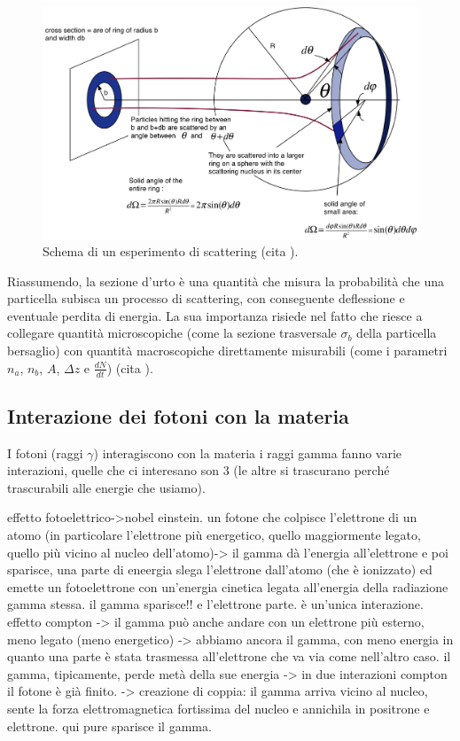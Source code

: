 \documentclass[12pt,a4paper,twoside]{report}
\begin{document}
	\begin{figure}[H]
		\centering
		\includegraphics[width=0.9\linewidth]{images/solid_angle.png}
		\caption{Schema di un esperimento di scattering (cita
			).}
		\label{fig:solid_angle}
	\end{figure}
	
	Riassumendo, la sezione d'urto è una quantità che misura la probabilità che una particella subisca un processo di scattering, con conseguente deflessione e eventuale perdita di energia. La sua importanza risiede nel fatto che riesce a collegare quantità microscopiche (come la sezione trasversale $\sigma_b$ della particella bersaglio) con quantità macroscopiche direttamente misurabili (come i parametri $n_a$, $n_b$, $A$, $\Delta z$ e $\frac{dN}{dt}$) (cita
	).
	
	\subsection{Interazione dei fotoni con la materia}	
	I fotoni (raggi $\gamma$) interagiscono con la materia i raggi gamma fanno varie interazioni, quelle che ci interesano son 3 (le altre si trascurano perché trascurabili alle energie che usiamo).
	
	effetto fotoelettrico->nobel einstein. un fotone che colpisce l'elettrone di un atomo (in particolare l'elettrone più energetico, quello maggiormente legato, quello più vicino al nucleo dell'atomo)-> il gamma dà l'energia all'elettrone e poi sparisce, una parte di eneergia slega l'elettrone dall'atomo (che è ionizzato) ed emette un fotoelettrone con un'energia cinetica legata all'energia della radiazione gamma stessa. il gamma sparisce!! e l'elettrone parte. è un'unica interazione. effetto compton -> il gamma può anche andare con un elettrone più esterno, meno legato (meno energetico) -> abbiamo ancora il gamma, con meno energia in quanto una parte è stata trasmessa all'elettrone che va via come nell'altro caso. il gamma, tipicamente, perde metà della sue energia -> in due interazioni compton il fotone è già finito.
	-> creazione di coppia: il gamma arriva vicino al nucleo, sente la forza elettromagnetica fortissima del nucleo e annichila in positrone e elettrone. qui pure sparisce il gamma.
	
\end{document}
